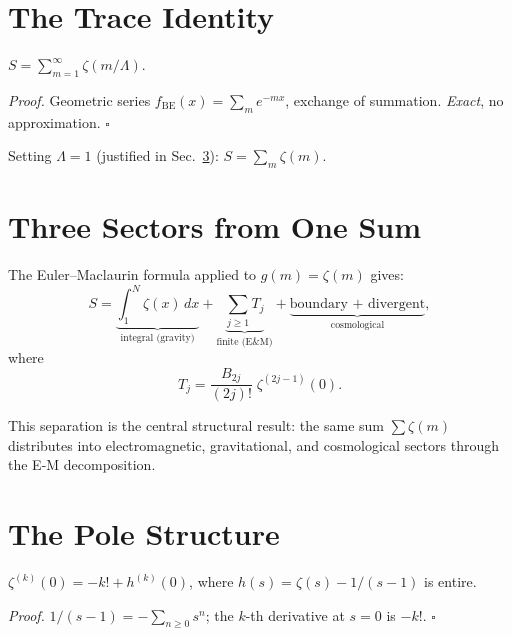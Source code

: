 \documentclass[aps,prd,twocolumn,superscriptaddress,nofootinbib]{revtex4-2}
\begin{document}
\section{The Trace Identity}\label{sec:trace}

\begin{theorem}\label{thm:trace}
$\displaystyle S=\sum_{m=1}^{\infty}\zeta(m/\Lambda)$.
\end{theorem}
\noindent\emph{Proof.}  Geometric series
$f_{\mathrm{BE}}(x)=\sum_m e^{-mx}$, exchange of summation.
\emph{Exact}, no approximation.  $\square$

Setting $\Lambda=1$ (justified in Sec.~\ref{sec:pole}):
$S=\sum_m\zeta(m)$.

\section{Three Sectors from One Sum}\label{sec:EM}

The Euler--Maclaurin formula applied to $g(m)=\zeta(m)$ gives:
\begin{equation}\label{eq:EM}
  S = \underbrace{\int_1^N\!\zeta(x)\,dx}_{\text{integral (gravity)}}
  + \underbrace{\sum_{j\geq 1}T_j}_{\text{finite (E\&M)}}
  + \underbrace{\text{boundary + divergent}}_{\text{cosmological}},
\end{equation}
where
\begin{equation}\label{eq:Tj}
  T_j = \frac{B_{2j}}{(2j)!}\;\zeta^{(2j-1)}(0).
\end{equation}

This separation is the central structural result: the same sum
$\sum\zeta(m)$ distributes into electromagnetic, gravitational,
and cosmological sectors through the E-M decomposition.

\section{The Pole Structure}\label{sec:pole}

\begin{lemma}\label{lem:pole}
$\zeta^{(k)}(0)=-k!+h^{(k)}(0)$, where
$h(s)=\zeta(s)-1/(s{-}1)$ is entire.
\end{lemma}
\noindent\emph{Proof.}
$1/(s{-}1)=-\sum_{n\geq 0}s^n$; the $k$-th derivative at $s=0$
is $-k!$.  $\square$
\end{document}
